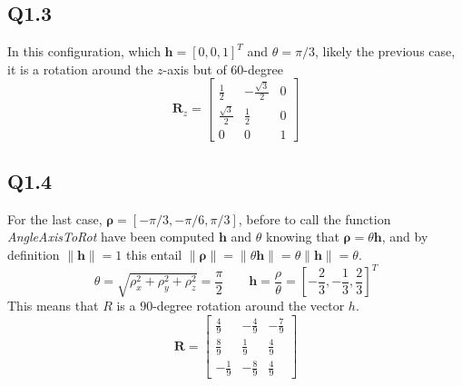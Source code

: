 \subsection{Q1.3}
In this configuration, which $\mathbf{h} = [0, 0, 1]^T$ and $\theta = \pi/3$, likely the previous case, it is a rotation around the $z$-axis but of $60$-degree
\begin{equation*}
	\mathbf{R}_z = \begin{bmatrix}
				\frac{1}{2} & -\frac{\sqrt{3}}{2} & 0 \\
				\frac{\sqrt{3}}{2} & \frac{1}{2} & 0 \\
				0 & 0 & 1
			\end{bmatrix}
\end{equation*}

\subsection{Q1.4}
For the last case, $\mathbf{\rho} = [-\pi/3, -\pi/6 ,\pi/3]$, before to call the function \textit{AngleAxisToRot} have been computed $\mathbf{h}$ and $\theta$ knowing that $\mathbf{\rho} = \theta\mathbf{h}$, and by definition $\parallel \mathbf{h} \parallel = 1$ this entail $\parallel \mathbf{\rho} \parallel = \parallel \theta \mathbf{h} \parallel = \theta \parallel \mathbf{h} \parallel = \theta$.
\begin{equation*}
	\theta = \sqrt{\rho _x^2 +\rho _y^2 +\rho _z^2} = \frac{\pi}{2} \qquad \mathbf{h} = \frac{\rho}{\theta} = [-\frac{2}{3},-\frac{1}{3},\frac{2}{3}]^T
\end{equation*}
This means that $R$ is a $90$-degree rotation around the vector $h$.
\begin{equation*}
	\mathbf{R} = \begin{bmatrix} 
		\frac{4}{9} & -\frac{4}{9} & -\frac{7}{9} \\
		\frac{8}{9} & \frac{1}{9} & \frac{4}{9} \\
		-\frac{1}{9} & -\frac{8}{9} & \frac{4}{9} 
	\end{bmatrix}
\end{equation*}

